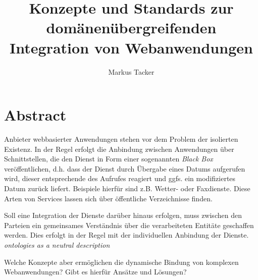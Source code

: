 \documentclass[12pt,a4paper]{article}
\begin{document}
\author{Markus Tacker}
\title{Konzepte und Standards zur domänenübergreifenden Integration von Webanwendungen}
\maketitle
\section*{Abstract}
Anbieter webbasierter Anwendungen stehen vor dem Problem der isolierten Existenz. In der Regel erfolgt die Anbindung zwischen Anwendungen über Schnittstellen, die den Dienst in Form einer sogenannten \emph{Black Box} veröffentlichen, d.h. dass der Dienst durch Übergabe eines Datums aufgerufen wird, dieser entsprechende des Aufrufes reagiert und ggfs. ein modifiziertes Datum zurück liefert. Beispiele hierfür sind z.B. Wetter- oder Faxdienste. Diese Arten von Services lassen sich über öffentliche Verzeichnisse finden.

Soll eine Integration der Dienste darüber hinaus erfolgen, muss zwischen den Parteien ein gemeinsames Verständnis über die verarbeiteten Entitäte geschaffen werden. Dies erfolgt in der Regel mit der individuellen Anbindung der Dienste. \emph{ontologies as a
neutral description}

Welche Konzepte aber ermöglichen die dynamische Bindung von komplexen Webanwendungen? Gibt es hierfür Ansätze und Lösungen?

 
\end{document}
